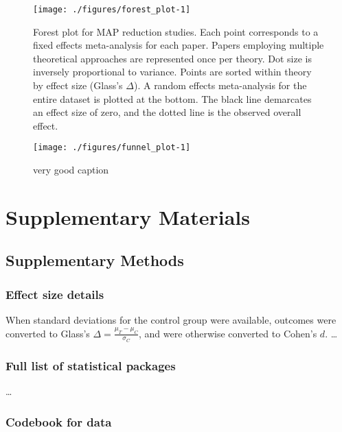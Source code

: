 \documentclass[sn-nature,referee,pdflatex]{sn-jnl}
\begin{document}
\begin{figure}[H]

{\centering \texttt{[image: ./figures/forest\_plot-1]} 

}

\caption{Forest plot for MAP reduction studies. Each point corresponds to a fixed effects meta-analysis for each paper. Papers employing multiple theoretical approaches are represented once per theory. Dot size is inversely proportional to variance. Points are sorted within theory by effect size (Glass's $\Delta$). A random effects meta-analysis for the entire dataset is plotted at the bottom. The black line demarcates an effect size of zero, and the dotted line is the observed overall effect.}\label{fig:forest_plot}
\end{figure}

\begin{figure}
\texttt{[image: ./figures/funnel\_plot-1]} \caption{very good caption }\label{fig:funnel_plot}
\end{figure}

\newpage

\section{Supplementary Materials}\label{Sec5}

\subsection{Supplementary Methods}\label{Sec5.1}

\subsubsection{Effect size details}\label{effect-size-details}

When standard deviations for the control group were available, outcomes
were converted to Glass's \(\Delta = \frac{\mu_T - \mu_C}{\sigma_C}\),
and were otherwise converted to Cohen's \(d\). \ldots{}

\subsubsection{Full list of statistical
packages}\label{full-list-of-statistical-packages}

\ldots{}

\subsubsection{Codebook for data}\label{codebook-for-data}
\end{document}
